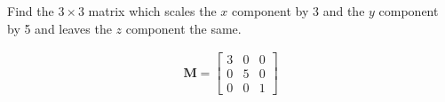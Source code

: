 Find the $3 \times 3$ matrix which scales the $x$ component by 3 and the $y$ component by 5 and leaves the $z$ component the same.

\begin{solution}
\begin{align*}
    \boldsymbol{M} = \begin{bmatrix}
    3 & 0 & 0 \\ 0 & 5 & 0 \\ 0 & 0 & 1
    \end{bmatrix}
\end{align*}
\end{solution}